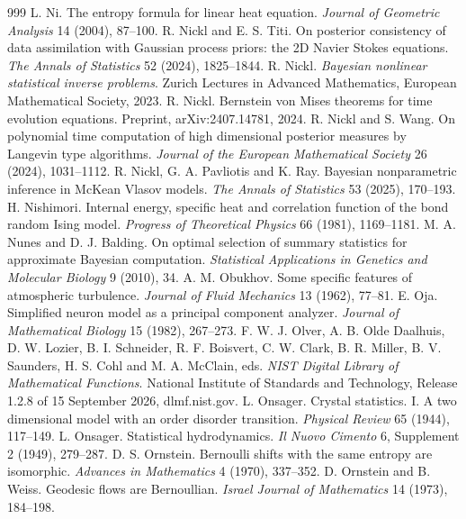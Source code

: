 \begin{thebibliography}{999}
 L. Ni. The entropy formula for linear heat equation. \emph{Journal of Geometric Analysis} 14 (2004), 87--100.
 R. Nickl and E. S. Titi. On posterior consistency of data assimilation with Gaussian process priors: the 2D Navier Stokes equations. \emph{The Annals of Statistics} 52 (2024), 1825--1844.
 R. Nickl. \emph{Bayesian nonlinear statistical inverse problems}. Zurich Lectures in Advanced Mathematics, European Mathematical Society, 2023.
 R. Nickl. Bernstein von Mises theorems for time evolution equations. Preprint, arXiv:2407.14781, 2024.
 R. Nickl and S. Wang. On polynomial time computation of high dimensional posterior measures by Langevin type algorithms. \emph{Journal of the European Mathematical Society} 26 (2024), 1031--1112.
 R. Nickl, G. A. Pavliotis and K. Ray. Bayesian nonparametric inference in McKean Vlasov models. \emph{The Annals of Statistics} 53 (2025), 170--193.
 H. Nishimori. Internal energy, specific heat and correlation function of the bond random Ising model. \emph{Progress of Theoretical Physics} 66 (1981), 1169--1181.
 M. A. Nunes and D. J. Balding. On optimal selection of summary statistics for approximate Bayesian computation. \emph{Statistical Applications in Genetics and Molecular Biology} 9 (2010), 34.
 A. M. Obukhov. Some specific features of atmospheric turbulence. \emph{Journal of Fluid Mechanics} 13 (1962), 77--81.
 E. Oja. Simplified neuron model as a principal component analyzer. \emph{Journal of Mathematical Biology} 15 (1982), 267--273.
 F. W. J. Olver, A. B. Olde Daalhuis, D. W. Lozier, B. I. Schneider, R. F. Boisvert, C. W. Clark, B. R. Miller, B. V. Saunders, H. S. Cohl and M. A. McClain, eds. \emph{NIST Digital Library of Mathematical Functions}. National Institute of Standards and Technology, Release 1.2.8 of 15 September 2026, dlmf.nist.gov.
 L. Onsager. Crystal statistics. I. A two dimensional model with an order disorder transition. \emph{Physical Review} 65 (1944), 117--149.
 L. Onsager. Statistical hydrodynamics. \emph{Il Nuovo Cimento} 6, Supplement 2 (1949), 279--287.
 D. S. Ornstein. Bernoulli shifts with the same entropy are isomorphic. \emph{Advances in Mathematics} 4 (1970), 337--352.
 D. Ornstein and B. Weiss. Geodesic flows are Bernoullian. \emph{Israel Journal of Mathematics} 14 (1973), 184--198.

\end{thebibliography}
